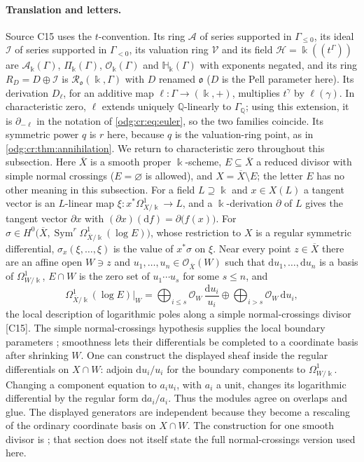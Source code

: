 \documentclass[11pt,oneside]{article}
\numberwithin{equation}{section}
\theoremstyle{definition}
\theoremstyle{remark}
\newcommand{\Q}{\mathbb Q}
\newcommand{\src}[1]{\textup{\textsf{\small[#1]}}}
\newcommand{\crH}{\mathbb H_\Bbbk(\Gamma)}
\newcommand{\crA}{\mathcal A_\Bbbk(\Gamma)}
\newcommand{\crP}{\Pi_\Bbbk(\Gamma)}
\newcommand{\crO}{\mathcal O_\Bbbk(\Gamma)}
\newcommand{\Sym}{\operatorname{Sym}}
\newcommand{\dif}{\mathrm d}
\begin{document}
\paragraph{Translation and letters.} Source C15 uses the $t$-convention. Its ring
$\mathcal A$ of series supported in $\Gamma_{\le0}$, its ideal $\mathcal I$ of series
supported in $\Gamma_{<0}$, its valuation ring $\mathcal V$ and its field
$\mathcal H=\Bbbk((t^\Gamma))$ are $\crA$, $\crP$, $\crO$ and $\crH$ with exponents
negated, and its ring $R_D=D\oplus\mathcal I$ is $\mathcal R_{\mathfrak o}(\Bbbk,\Gamma)$
with $D$ renamed $\mathfrak o$ ($D$ is the Pell parameter here). Its derivation
$D_\ell$, for an additive map $\ell:\Gamma\to(\Bbbk,+)$, multiplies $t^\gamma$ by
$\ell(\gamma)$. In characteristic zero, $\ell$ extends uniquely
$\Q$-linearly to $\Gamma_\Q$; using this extension, it is
$\partial_{-\ell}$ in the notation of
\eqref{odg:cr:eq:euler}, so the two families coincide. Its symmetric power $q$ is
$r$ here, because $q$ is the valuation-ring point, as in
\cref{odg:cr:thm:annihilation}. We return to characteristic zero throughout
this subsection. Here $\overline X$ is a smooth
proper $\Bbbk$-scheme, $E\subseteq\overline X$ a reduced divisor with simple normal
crossings ($E=\varnothing$ is allowed), and $X=\overline X\setminus E$; the letter $E$
has no other meaning in this subsection. For a field $L\supseteq\Bbbk$ and $x\in X(L)$
a tangent vector is an $L$-linear map $\xi:x^*\Omega^1_{X/\Bbbk}\to L$, and a
$\Bbbk$-derivation $\partial$ of $L$ gives the tangent vector $\partial x$ with
$(\partial x)(\dif f)=\partial\bigl(f(x)\bigr)$. For
$\sigma\in H^0\bigl(\overline X,\Sym^r\Omega^1_{\overline X/\Bbbk}(\log E)\bigr)$, whose
restriction to $X$ is a regular symmetric differential, $\sigma_x(\xi,\ldots,\xi)$ is the
value of $x^*\sigma$ on $\xi$. Near every point $z\in\overline X$ there are an affine
open $W\ni z$ and $u_1,\ldots,u_n\in\mathcal O_{\overline X}(W)$ such that
$\dif u_1,\ldots,\dif u_n$ is a basis of $\Omega^1_{W/\Bbbk}$, $E\cap W$ is the zero set
of $u_1\cdots u_s$ for some $s\le n$, and
\begin{equation}\label{odg:log:eq:basis}
 \Omega^1_{\overline X/\Bbbk}(\log E)\big|_W
 =\bigoplus_{i\le s}\mathcal O_W\,\frac{\dif u_i}{u_i}
 \oplus\bigoplus_{i>s}\mathcal O_W\,\dif u_i ,
\end{equation}
the local description of logarithmic poles along a simple normal-crossings
divisor \src{C15}. The simple normal-crossings hypothesis supplies the local
boundary parameters \cite[Tag 0BI9]{StacksSNC}; smoothness lets their
differentials be completed to a coordinate basis after shrinking $W$.
One can construct the displayed sheaf inside the regular differentials on
$X\cap W$: adjoin $\dif u_i/u_i$ for the boundary components to
$\Omega^1_{W/\Bbbk}$. Changing a component equation to $a_i u_i$, with
$a_i$ a unit, changes its logarithmic differential by the regular form
$\dif a_i/a_i$. Thus the modules agree on overlaps and glue. The displayed
generators are independent because they become a rescaling of the ordinary
coordinate basis on $X\cap W$. The construction for one smooth divisor is
\cite[Section 50.15]{StacksLog}; that section does not itself state the full
normal-crossings version used here.
\end{document}
